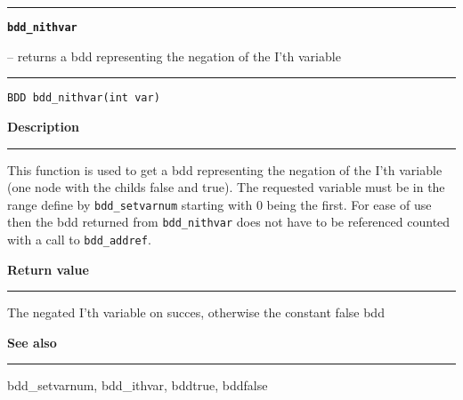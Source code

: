 \begin{minipage}{\textwidth}

\noindent\begin{minipage}{\textwidth}
\rule{\textwidth}{0.5mm}
{\tt\bf bdd\_nithvar }
\--- returns a bdd representing the negation of the I'th variable  \hspace{\fill}
\\\rule[1.5ex]{\textwidth}{0.5mm}
\end{minipage}

\noindent\begin{verbatim}
BDD bdd_nithvar(int var) 
\end{verbatim}

\vspace{\parsep}\noindent
{\bf Description}\\\rule[1.5ex]{\textwidth}{0.2mm}\vspace{-1.5ex}\setlength{\parindent}{1em}
This function is used to get a bdd representing the negation of
           the I'th variable (one node with the childs false and true).
	   The requested variable must be in the range define by
	   {\tt bdd\_setvarnum} starting with 0 being the first. For ease of
	   use then the bdd returned from {\tt bdd\_nithvar} does not have
	   to be referenced counted with a call to {\tt bdd\_addref}. 

\setlength{\parindent}{0em}\vspace{\parsep}\vspace{\baselineskip}\noindent
{\bf Return value}\\\rule[1.5ex]{\textwidth}{0.2mm}\vspace{-1.5ex}
The negated I'th variable on succes, otherwise the constant false bdd 

\vspace{\parsep}\vspace{\baselineskip}\noindent
{\bf See also}\\\rule[1.5ex]{\textwidth}{0.2mm}\vspace{-1.5ex}
bdd\_setvarnum, bdd\_ithvar, bddtrue, bddfalse 
\end{minipage}
\vspace{8ex}
